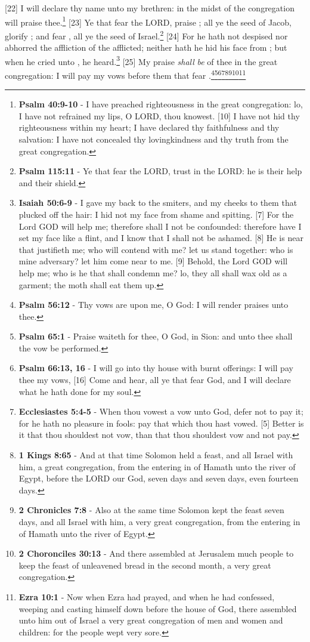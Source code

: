 [22] \textcolor[cmyk]{0.99998,1,0,0}{I will declare thy name unto my brethren: in the midst of the congregation will praise thee.}\footnote{\textbf{Psalm 40:9-10} - I have preached righteousness in the great congregation: lo, I have not refrained my lips, O LORD, thou knowest. [10] I have not hid thy righteousness within my heart; I have declared thy faithfulness and thy salvation: I have not concealed thy lovingkindness and thy truth from the great congregation.}
[23] \textcolor[cmyk]{0.99998,1,0,0}{Ye that fear the LORD, praise ; all ye the seed of Jacob, glorify ; and fear , all ye the seed of Israel.}\footnote{\textbf{Psalm 115:11} - Ye that fear the LORD, trust in the LORD: he is their help and their shield.}
[24] \textcolor[cmyk]{0.99998,1,0,0}{For he hath not despised nor abhorred the affliction of the afflicted; neither hath he hid his face from ; but when he cried unto , he heard.}\footnote{\textbf{Isaiah 50:6-9} - I gave my back to the smiters, and my cheeks to them that plucked off the hair: I hid not my face from shame and spitting. [7] For the Lord GOD will help me; therefore shall I not be confounded: therefore have I set my face like a flint, and I know that I shall not be ashamed. [8] He is near that justifieth me; who will contend with me? let us stand together: who is mine adversary? let him come near to me. [9] Behold, the Lord GOD will help me; who is he that shall condemn me? lo, they all shall wax old as a garment; the moth shall eat them up.}
[25] \textcolor[cmyk]{0.99998,1,0,0}{My praise \emph{shall} \emph{be} of thee in the great congregation: I will pay my vows before them that fear .}\footnote{\textbf{Psalm 56:12} - Thy vows are upon me, O God: I will render praises unto thee.}\footnote{\textbf{Psalm 65:1} - Praise waiteth for thee, O God, in Sion: and unto thee shall the vow be performed.}\footnote{\textbf{Psalm 66:13, 16} - I will go into thy house with burnt offerings: I will pay thee my vows, [16] Come and hear, all ye that fear God, and I will declare what he hath done for my soul.}\footnote{\textbf{Ecclesiastes 5:4-5} - When thou vowest a vow unto God, defer not to pay it; for he hath no pleasure in fools: pay that which thou hast vowed. [5] Better is it that thou shouldest not vow, than that thou shouldest vow and not pay.}\footnote{\textbf{1 Kings 8:65} - And at that time Solomon held a feast, and all Israel with him, a great congregation, from the entering in of Hamath unto the river of Egypt, before the LORD our God, seven days and seven days, even fourteen days.}\footnote{\textbf{2 Chronicles 7:8} - Also at the same time Solomon kept the feast seven days, and all Israel with him, a very great congregation, from the entering in of Hamath unto the river of Egypt.}\footnote{\textbf{2 Choronciles 30:13} - And there assembled at Jerusalem much people to keep the feast of unleavened bread in the second month, a very great congregation.}\footnote{\textbf{Ezra 10:1} - Now when Ezra had prayed, and when he had confessed, weeping and casting himself down before the house of God, there assembled unto him out of Israel a very great congregation of men and women and children: for the people wept very sore.}

